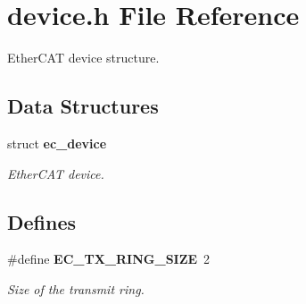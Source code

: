 \section{device.\-h \-File \-Reference}
\label{device_8h}


\-Ether\-C\-A\-T device structure.  


\subsection*{\-Data \-Structures}
\begin{DoxyCompactItemize}
\item 
struct {\bf ec\-\_\-device}
\begin{DoxyCompactList}\small\item\em \-Ether\-C\-A\-T device. \end{DoxyCompactList}\end{DoxyCompactItemize}
\subsection*{\-Defines}
\begin{DoxyCompactItemize}
\item 
\#define {\bf \-E\-C\-\_\-\-T\-X\-\_\-\-R\-I\-N\-G\-\_\-\-S\-I\-Z\-E}~2
\begin{DoxyCompactList}\small\item\em \-Size of the transmit ring. \end{DoxyCompactList}\end{DoxyCompactItemize}
